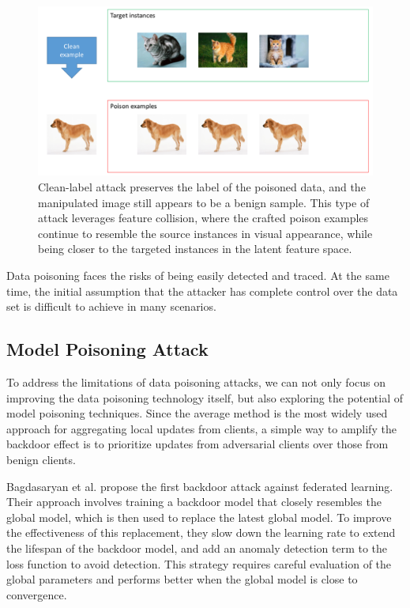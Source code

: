 \documentclass[conference]{IEEEtran}
\begin{document}
\begin{figure}[htbp]
    \centerline{\includegraphics[width=0.8\linewidth,height=0.6\linewidth]{picture/f7.png}}
    \caption{Clean-label attack preserves the label of the poisoned data,
    and the manipulated image still appears to be a benign sample. This type of attack
    leverages feature collision, where the crafted poison examples continue to
    resemble the source instances in visual appearance, while being closer to the
    targeted instances in the latent feature space.}
    \label{fig7}
\end{figure}

Data poisoning faces the risks of being easily detected and traced. 
At the same time, the initial assumption that the attacker has complete control over the data set is difficult to achieve in many scenarios.


\subsection{Model Poisoning Attack}
To address the limitations of data poisoning attacks, we can not only focus on
improving the data poisoning technology itself, but also exploring the potential
of model poisoning techniques. Since the average method is the most widely used
approach for aggregating local updates from clients, a simple way to amplify
the backdoor effect is to prioritize updates from adversarial clients over
those from benign clients.

Bagdasaryan et al.\cite{b241} propose the first backdoor attack against federated learning.
Their approach involves training a backdoor model that closely resembles the global
model, which is then used to replace the latest global model.
To improve the effectiveness of this replacement, they slow down
the learning rate to extend the lifespan of the backdoor model, and add an
anomaly detection term to the loss function to avoid detection. This
strategy requires careful evaluation of the global parameters and performs
better when the global model is close to convergence.
\end{document}

